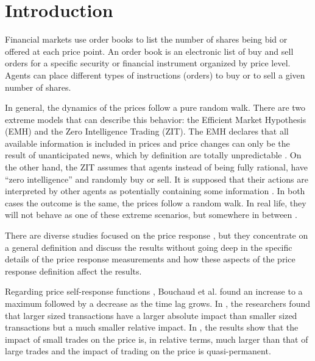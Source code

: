 \section{Introduction}\label{sec:introduction}

Financial markets use order books to list the number of shares being bid or
offered at each price point. An order book is an electronic list of buy and
sell orders for a specific security or financial instrument organized by price
level. Agents can place different types of instructions (orders) to buy or to
sell a given number of shares.

In general, the dynamics of the prices follow a pure random walk. There are two
extreme models that can describe this behavior: the Efficient Market Hypothesis
(EMH) and the Zero Intelligence Trading (ZIT). The EMH declares that all
available information is included in prices and price changes can only be the
result of unanticipated news, which by definition are totally unpredictable
\cite{subtle_nature,Bouchaud_2004,EMH_lillo,stat_theory}. On the other hand,
the ZIT assumes that agents instead of being fully rational, have ``zero
intelligence” and randomly buy or sell. It is supposed that their actions are
interpreted by other agents as potentially containing some information
\cite{subtle_nature,Bouchaud_2004,stat_theory,Wang_2016_cross}.
In both cases the outcome is the same, the prices follow a random walk.
In real life, they will not behave as one of these extreme scenarios, but
somewhere in between \cite{Bouchaud_2004,stat_theory}.

There are diverse studies focused on the price response
\cite{dissecting_cross,r_walks_liquidity,subtle_nature,Bouchaud_2004,large_prices_changes,pow_law_dist,theory_market_impact,spread_changes_affect,master_curve,EMH_lillo,quant_stock_price_response,ori_pow_law,prop_order_book,Wang_2018_b,Wang_2018_a,Wang_2016_avg,Wang_2016_cross},
but they concentrate on a general definition and discuss the results without
going deep in the specific details of the price response measurements and how
these aspects of the price response definition affect the results.

Regarding price self-response functions
\cite{r_walks_liquidity,subtle_nature,Bouchaud_2004}, Bouchaud et al. found
an increase to a maximum followed by a decrease as the time lag grows.
In \cite{theory_market_impact}, the researchers found that larger sized
transactions have a larger absolute impact than smaller sized transactions but
a much smaller relative impact. In \cite{prop_order_book}, the results show
that the impact of small trades on the price is, in relative terms, much larger
than that of large trades and the impact of trading on the price is
quasi-permanent.

